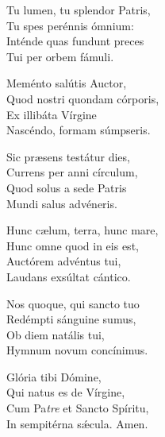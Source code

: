 Tu lumen, tu splendor Patris,\\
Tu spes perénnis ó\-mnium:\\
Inténde quas fundunt preces\\
Tui per orbem fámuli.

Meménto salútis Au\-ctor,\\
Quod nostri quondam córporis,\\
Ex illibáta Vírgine\\
Nascéndo, formam súmpseris.

Sic præsens testátur dies,\\
Currens per anni círculum,\\
Quod solus a sede Patris\\
Mundi salus advéneris.

Hunc cælum, terra, hunc mare,\\
Hunc o\-mne quod in eis est,\\
Auctórem advéntus tui,\\
Laudans exsúltat cántico.

Nos quoque, qui sancto tuo\\
Redémpti sánguine sumus,\\
Ob diem natális tui,\\
Hy\-mnum novum concínimus.

Glória tibi Dómine,\\
Qui natus es de Vírgine,\\
Cum Pa\tinyhspace\textit{tre} et San\-cto Spíritu,\\
In sempitérna sǽcula.
Amen.